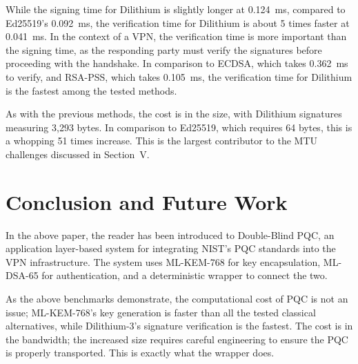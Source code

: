 \documentclass[10pt, conference, letterpaper]{IEEEtran}
\begin{document}
\begin{table}[hbt!]
\centering
\caption{Digital Signature Performance (mean of 25 iterations)}
\label{tab:sig}
\end{table}

While the signing time for Dilithium is slightly longer at 0.124~ms, compared to Ed25519's 0.092~ms, the verification time for Dilithium is about 5 times faster at 0.041~ms. In the context of a VPN, the verification time is more important than the signing time, as the responding party must verify the signatures before proceeding with the handshake. In comparison to ECDSA, which takes 0.362~ms to verify, and RSA-PSS, which takes 0.105~ms, the verification time for Dilithium is the fastest among the tested methods.

As with the previous methods, the cost is in the size, with Dilithium signatures measuring 3,293 bytes. In comparison to Ed25519, which requires 64 bytes, this is a whopping 51 times increase. This is the largest contributor to the MTU challenges discussed in Section~V.

\section{Conclusion and Future Work}
In the above paper, the reader has been introduced to Double-Blind PQC, an application layer-based system for integrating NIST's PQC standards into the VPN infrastructure. The system uses ML-KEM-768 for key encapsulation, ML-DSA-65 for authentication, and a deterministic wrapper to connect the two.

As the above benchmarks demonstrate, the computational cost of PQC is not an issue; ML-KEM-768's key generation is faster than all the tested classical alternatives, while Dilithium-3's signature verification is the fastest. The cost is in the bandwidth; the increased size requires careful engineering to ensure the PQC is properly transported. This is exactly what the wrapper does.
\end{document}
